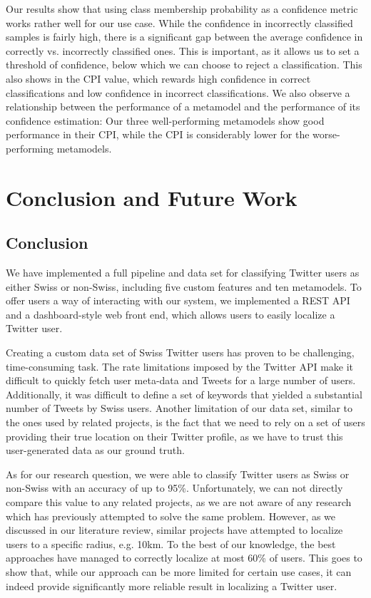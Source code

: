 \documentclass[10pt,a4paper]{article}
\begin{document}
Our results show that using class membership probability as a confidence metric works rather well for our use case. While the confidence in incorrectly classified samples is fairly high, there is a significant gap between the average confidence in correctly vs. incorrectly classified ones. This is important, as it allows us to set a threshold of confidence, below which we can choose to reject a classification. This also shows in the CPI value, which rewards high confidence in correct classifications and low confidence in incorrect classifications. We also observe a relationship between the performance of a metamodel and the performance of its confidence estimation: Our three well-performing metamodels show good performance in their CPI, while the CPI is considerably lower for the worse-performing metamodels.

\section{Conclusion and Future Work}
\subsection{Conclusion}
We have implemented a full pipeline and data set for classifying Twitter users as either Swiss or non-Swiss, including five custom features and ten metamodels. To offer users a way of interacting with our system, we implemented a REST API and a dashboard-style web front end, which allows users to easily localize a Twitter user.

Creating a custom data set of Swiss Twitter users has proven to be challenging, time-consuming task. The rate limitations imposed by the Twitter API make it difficult to quickly fetch user meta-data and Tweets for a large number of users. Additionally, it was difficult to define a set of keywords that yielded a substantial number of Tweets by Swiss users. Another limitation of our data set, similar to the ones used by related projects, is the fact that we need to rely on a set of users providing their true location on their Twitter profile, as we have to trust this user-generated data as our ground truth.

As for our research question, we were able to classify Twitter users as Swiss or non-Swiss with an accuracy of up to 95\%. Unfortunately, we can not directly compare this value to any related projects, as we are not aware of any research which has previously attempted to solve the same problem. However, as we discussed in our literature review, similar projects have attempted to localize users to a specific radius, e.g. 10km. To the best of our knowledge, the best approaches have managed to correctly localize at most 60\% of users. This goes to show that, while our approach can be more limited for certain use cases, it can indeed provide significantly more reliable result in localizing a Twitter user.
\end{document}
